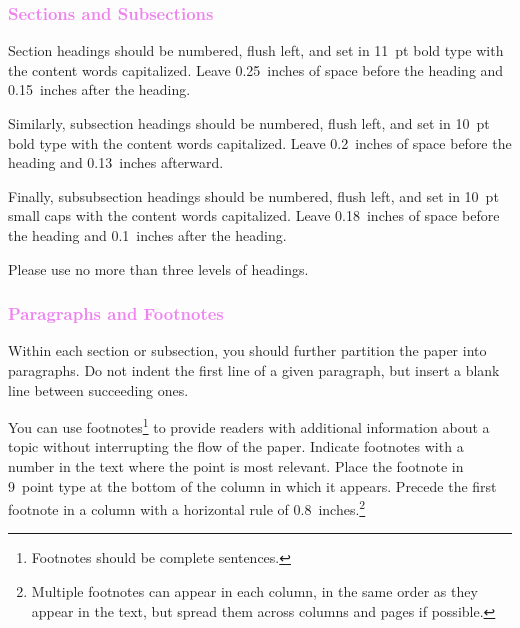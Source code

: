 \documentclass{article}
\newcommand{\csubsubsection}[1]{\subsubsection{\textcolor{violet}{#1}}}
\begin{document}
\csubsubsection{Sections and Subsections}

Section headings should be numbered, flush left, and set in 11~pt bold
type with the content words capitalized. Leave 0.25~inches of space
before the heading and 0.15~inches after the heading.

Similarly, subsection headings should be numbered, flush left, and set
in 10~pt bold type with the content words capitalized. Leave
0.2~inches of space before the heading and 0.13~inches afterward.

Finally, subsubsection headings should be numbered, flush left, and
set in 10~pt small caps with the content words capitalized. Leave
0.18~inches of space before the heading and 0.1~inches after the
heading.

Please use no more than three levels of headings.

\csubsubsection{Paragraphs and Footnotes}

Within each section or subsection, you should further partition the
paper into paragraphs. Do not indent the first line of a given
paragraph, but insert a blank line between succeeding ones.

You can use footnotes\footnote{Footnotes
should be complete sentences.} to provide readers with additional
information about a topic without interrupting the flow of the paper.
Indicate footnotes with a number in the text where the point is most
relevant. Place the footnote in 9~point type at the bottom of the
column in which it appears. Precede the first footnote in a column
with a horizontal rule of 0.8~inches.\footnote{Multiple footnotes can
appear in each column, in the same order as they appear in the text,
but spread them across columns and pages if possible.}
\end{document}
